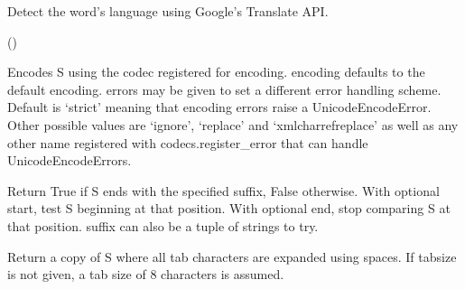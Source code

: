 \documentclass[letterpaper,10pt,english]{sphinxmanual}
\begin{document}
\begin{fulllineitems}
\begin{fulllineitems}
\end{fulllineitems}


\begin{fulllineitems}
\label{api_reference:textblob_de.blob.Word.detect_language}
Detect the word's language using Google's Translate API.

()

\end{fulllineitems}


\begin{fulllineitems}
\label{api_reference:textblob_de.blob.Word.encode}
Encodes S using the codec registered for encoding. encoding defaults
to the default encoding. errors may be given to set a different error
handling scheme. Default is `strict' meaning that encoding errors raise
a UnicodeEncodeError. Other possible values are `ignore', `replace' and
`xmlcharrefreplace' as well as any other name registered with
codecs.register\_error that can handle UnicodeEncodeErrors.

\end{fulllineitems}


\begin{fulllineitems}
\label{api_reference:textblob_de.blob.Word.endswith}
Return True if S ends with the specified suffix, False otherwise.
With optional start, test S beginning at that position.
With optional end, stop comparing S at that position.
suffix can also be a tuple of strings to try.

\end{fulllineitems}


\begin{fulllineitems}
\label{api_reference:textblob_de.blob.Word.expandtabs}
Return a copy of S where all tab characters are expanded using spaces.
If tabsize is not given, a tab size of 8 characters is assumed.


\end{fulllineitems}
\end{fulllineitems}
\end{document}
